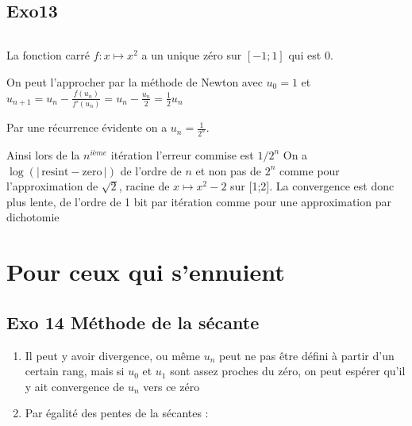 \documentclass[
  11pt,
]{article}
\newcounter{exo}
\newcounter{def}
\begin{document}
\begin{lstlisting}[language=Python]
\end{lstlisting}

\hypertarget{exo13}{%
\subsection{Exo13}\label{exo13}}

\begin{lstlisting}[language=Python]
\end{lstlisting}

La fonction carré \(f:x \mapsto x^2\) a un unique zéro sur \([-1;1]\)
qui est 0.

On peut l'approcher par la méthode de Newton avec \(u_0=1\) et
\(u_{n+1}=u_{n}-\frac{f(u_n)}{f'(u_n)}=u_n-\frac{u_n}{2} = \frac{1}{2}u_n\)

Par une récurrence évidente on a \(u_n=\frac{1}{2^n}\).

Ainsi lors de la \(n^{ième}\) itération l'erreur commise est \(1/2^n\)
On a \(\log(\vert \, \text{resint}-\text{zero} \, \vert)\) de l'ordre de
\(n\) et non pas de \(2^n\) comme pour l'approximation de \(\sqrt{2}\),
racine de \(x \mapsto x^2 - 2\) sur {[}1;2{]}. La convergence est donc
plus lente, de l'ordre de 1 bit par itération comme pour une
approximation par dichotomie

\hypertarget{pour-ceux-qui-sennuient}{%
\section{Pour ceux qui s'ennuient}\label{pour-ceux-qui-sennuient}}

\hypertarget{exo-14-muxe9thode-de-la-suxe9cante}{%
\subsection{Exo 14 Méthode de la
sécante}\label{exo-14-muxe9thode-de-la-suxe9cante}}

\begin{enumerate}
\def\labelenumi{\arabic{enumi}.}
\item
  Il peut y avoir divergence, ou même \(u_n\) peut ne pas être défini à
  partir d'un certain rang, mais si \(u_0\) et \(u_1\) sont assez
  proches du zéro, on peut espérer qu'il y ait convergence de \(u_n\)
  vers ce zéro
\item
  Par égalité des pentes de la sécantes :
\end{enumerate}
\end{document}
